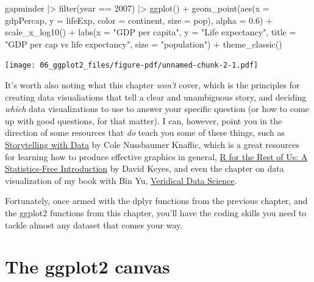 \documentclass[
  letterpaper,
  DIV=11,
  numbers=noendperiod]{scrreprt}
\newenvironment{Shaded}{\begin{snugshade}}{\end{snugshade}}
\newcommand{\AttributeTok}[1]{\textcolor[rgb]{0.40,0.45,0.13}{#1}}
\newcommand{\DecValTok}[1]{\textcolor[rgb]{0.68,0.00,0.00}{#1}}
\newcommand{\FloatTok}[1]{\textcolor[rgb]{0.68,0.00,0.00}{#1}}
\newcommand{\FunctionTok}[1]{\textcolor[rgb]{0.28,0.35,0.67}{#1}}
\newcommand{\NormalTok}[1]{\textcolor[rgb]{0.00,0.23,0.31}{#1}}
\newcommand{\SpecialCharTok}[1]{\textcolor[rgb]{0.37,0.37,0.37}{#1}}
\newcommand{\StringTok}[1]{\textcolor[rgb]{0.13,0.47,0.30}{#1}}
\begin{document}
\begin{Shaded}
\begin{Highlighting}[]
\NormalTok{gapminder }\SpecialCharTok{|\textgreater{}}
  \FunctionTok{filter}\NormalTok{(year }\SpecialCharTok{==} \DecValTok{2007}\NormalTok{) }\SpecialCharTok{|\textgreater{}}
  \FunctionTok{ggplot}\NormalTok{() }\SpecialCharTok{+} 
  \FunctionTok{geom\_point}\NormalTok{(}\FunctionTok{aes}\NormalTok{(}\AttributeTok{x =}\NormalTok{ gdpPercap, }
                 \AttributeTok{y =}\NormalTok{ lifeExp, }
                 \AttributeTok{color =}\NormalTok{ continent,}
                 \AttributeTok{size =}\NormalTok{ pop),}
             \AttributeTok{alpha =} \FloatTok{0.6}\NormalTok{) }\SpecialCharTok{+} 
  \FunctionTok{scale\_x\_log10}\NormalTok{() }\SpecialCharTok{+} 
  \FunctionTok{labs}\NormalTok{(}\AttributeTok{x =} \StringTok{"GDP per capita"}\NormalTok{, }\AttributeTok{y =} \StringTok{"Life expectancy"}\NormalTok{, }\AttributeTok{title =} \StringTok{"GDP per cap vs life expectancy"}\NormalTok{, }\AttributeTok{size =} \StringTok{"population"}\NormalTok{) }\SpecialCharTok{+} 
  \FunctionTok{theme\_classic}\NormalTok{()}
\end{Highlighting}
\end{Shaded}

\texttt{[image: 06\_ggplot2\_files/figure-pdf/unnamed-chunk-2-1.pdf]}

It's worth also noting what this chapter \emph{won't} cover, which is
the principles for creating data visualiations that tell a clear and
unambiguous story, and deciding \emph{which} data visualizations to use
to answer your specific question (or how to come up with good questions,
for that matter). I can, however, point you in the direction of some
resources that \emph{do} teach you some of these things, such as
\href{https://www.storytellingwithdata.com/books}{Storytelling with
Data} by Cole Nussbaumer Knaflic, which is a great resources for
learning how to produce effective graphics in general,
\href{https://book.rfortherestofus.com/}{R for the Rest of Us: A
Statistics-Free Introduction} by David Keyes, and even the chapter on
data visualization of my book with Bin Yu,
\href{https://vdsbook.com/05-data_viz}{Veridical Data Science}.

Fortunately, once armed with the dplyr functions from the previous
chapter, and the ggplot2 functions from this chapter, you'll have the
coding skills you need to tackle almost any dataset that comes your way.

\section{The ggplot2 canvas}\label{the-ggplot2-canvas}
\end{document}

